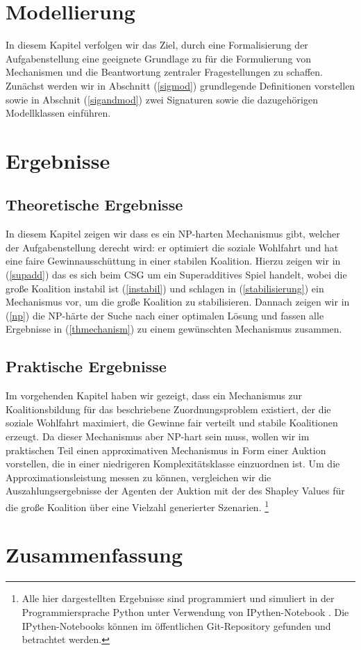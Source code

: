 \documentclass[sigconf]{acmart}
\theoremstyle{break}
\begin{document}
\section{Modellierung}
\label{mod}
In diesem Kapitel verfolgen wir das Ziel, durch eine Formalisierung der Aufgabenstellung eine geeignete Grundlage zu für die Formulierung von Mechanismen und die Beantwortung zentraler Fragestellungen zu schaffen. Zunächst werden wir in Abschnitt (\ref{sigmod}) grundlegende Definitionen vorstellen sowie in Abschnit (\ref{sigandmod}) zwei Signaturen sowie die dazugehörigen Modellklassen einführen.



\section{Ergebnisse}
\label{ergebnisse}
\subsection{Theoretische Ergebnisse}
In diesem Kapitel zeigen wir dass es ein NP-harten Mechanismus gibt, welcher der Aufgabenstellung derecht wird: er optimiert die soziale Wohlfahrt und hat eine faire Gewinnausschüttung in einer stabilen Koalition. Hierzu zeigen wir in (\ref{supadd}) das es sich beim CSG um ein Superadditives Spiel handelt, wobei die große Koalition instabil ist (\ref{instabil}) und schlagen in (\ref{stabilisierung}) ein Mechanismus vor, um die große Koalition zu stabilisieren. Dannach zeigen wir in (\ref{np}) die NP-härte der Suche nach einer optimalen Lösung und fassen alle Ergebnisse in (\ref{thmechanism}) zu einem gewünschten Mechanismus zusammen.



\subsection{Praktische Ergebnisse}
Im vorgehenden Kapitel haben wir gezeigt, dass ein Mechanismus zur Koalitionsbildung für das beschriebene Zuordnungsproblem existiert, der die soziale Wohlfahrt maximiert, die Gewinne fair verteilt und stabile Koalitionen erzeugt. Da dieser Mechanismus aber NP-hart sein muss, wollen wir im praktischen Teil einen approximativen Mechanismus in Form einer Auktion vorstellen, die in einer niedrigeren Komplexitätsklasse einzuordnen ist. Um die Approximationsleistung messen zu können, vergleichen wir die Auszahlungsergebnisse der Agenten der Auktion mit der des Shapley Values für die große Koalition über eine Vielzahl generierter Szenarien. \footnote{Alle hier dargestellten Ergebnisse sind programmiert und simuliert in der Programmiersprache Python unter Verwendung von IPythen-Notebook \cite{PER-GRA:2007}. Die IPythen-Notebooks können im öffentlichen Git-Repository \cite{git} gefunden und betrachtet werden.}


\section{Zusammenfassung}



\end{document}
